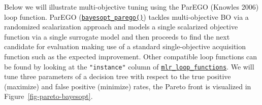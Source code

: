 Below we will illustrate multi-objective tuning using the ParEGO
(Knowles 2006) loop function. ParEGO
(\href{https://mlr3mbo.mlr-org.com/reference/mlr_loop_functions_parego.html}{\texttt{bayesopt\_parego()}})
tackles multi-objective BO via a randomized scalarization approach and
models a single scalarized objective function via a single surrogate
model and then proceeds to find the next candidate for evaluation making
use of a standard single-objective acquisition function such as the
expected improvement. Other compatible loop functions can be found by
looking at the \texttt{"instance"} column of
\href{https://mlr3mbo.mlr-org.com/reference/mlr_loop_functions.html}{\texttt{mlr\_loop\_functions}}.
We will tune three parameters of a decision tree with respect to the
true positive (maximize) and false positive (minimize) rates, the Pareto
front is visualized in
Figure~\ref{fig-pareto-bayesopt}.

\begin{Shaded}
\begin{Highlighting}[]
\OtherTok{=} \NormalTok{(}\NormalTok{,}

\OtherTok{=} \NormalTok{(}\NormalTok{,}
   \NormalTok{(}\NormalTok{, }\NormalTok{),}
   \NormalTok{(}\NormalTok{, }\NormalTok{),}
   \NormalTok{(}\NormalTok{, }\NormalTok{)}
\NormalTok{)}

\OtherTok{=} \NormalTok{(}\NormalTok{(}\NormalTok{, } \NormalTok{),}
  \NormalTok{(}\NormalTok{(}\NormalTok{, }\NormalTok{)), }\NormalTok{)}
\end{Highlighting}
\end{Shaded}

